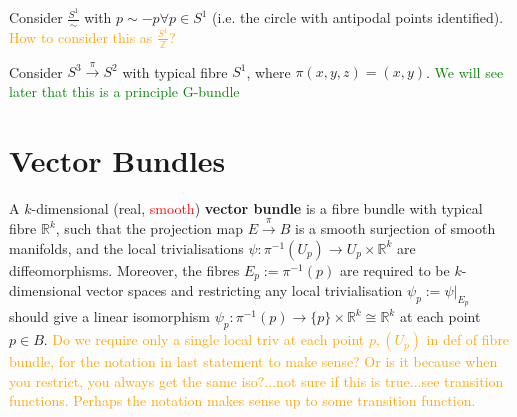 \documentclass[a4paper]{article}
\theoremstyle{definition} \newtheorem*{definition}{Definition}
\theoremstyle{definition} \newtheorem*{definitions}{Definitions}
\theoremstyle{plain} \newtheorem{theorem}{Theorem}[section]
\theoremstyle{plain} \newtheorem{proposition}[theorem]{Proposition}
\theoremstyle{plain} \newtheorem{corollary}[theorem]{Corollary}
\theoremstyle{plain} \newtheorem{lemma}[theorem]{Lemma}
\theoremstyle{plain} \newtheorem{example}[theorem]{Example}
\newcommand{\checkCorrect}[1]{\textcolor{red}{#1}}
\newcommand{\question}[1]{\textcolor{orange}{#1}}
\newcommand{\finish}[1]{\textcolor{green}{#1}}
\newcommand{\defn}[1]{\textbf{#1}}
\newcommand{\realnos}{\mathbb{R}}
\newcommand{\canonicaliso}{\cong}
\begin{document}
Consider $\frac{S^1}{\sim}$ with $p\sim -p \forall p\in S^1$ (i.e. the circle with antipodal points identified). \question{How to consider this as $\frac{S^1}{\mathbb{Z}}$?}


Consider $S^3\xrightarrow{\pi} S^2$ with typical fibre $S^1$, where $\pi(x, y, z)=(x, y)$. \finish{We will see later that this is a principle G-bundle}

\section{Vector Bundles}
A $k$-dimensional (real, \checkCorrect{smooth}) \defn{vector bundle} is a fibre bundle with typical fibre $\realnos^k$, such that the projection map $E\xrightarrow{\pi} B$ is a smooth surjection of smooth manifolds, and the local trivialisations $\psi:\pi^{-1}(U_p) \rightarrow U_p \times \realnos^k$ are diffeomorphisms. Moreover, the fibres $E_p:=\pi^{-1}(p)$ are required to be $k$-dimensional vector spaces and restricting any local trivialisation $\psi_p:=\psi \vert_{E_p}$ should give a linear isomorphism $\psi_p:\pi^{-1}(p)\rightarrow \{p\} \times \realnos^k \canonicaliso \realnos^k$ at each point $p\in B$. \question{Do we require only a single local triv at each point $p, (U_p)$ in def of fibre bundle, for the notation in last statement to make sense? Or is it because when you restrict, you always get the same iso?...not sure if this is true...see transition functions. Perhaps the notation makes sense up to some transition function.}
\end{document}
